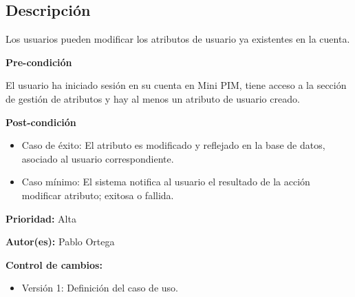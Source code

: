 

\subsection*{Descripción}
Los usuarios pueden modificar los atributos de usuario ya existentes en la cuenta.
\vspace{0.15cm}

\textbf{Pre-condición}\par
El usuario ha iniciado sesión en su cuenta en Mini PIM, tiene acceso a la sección de gestión de atributos y hay al menos un atributo de usuario creado.\par
\vspace{0.15cm}

\textbf{Post-condición}
\begin{itemize}
    \item Caso de éxito: El atributo es modificado y reflejado en la base de datos, asociado al usuario correspondiente.
    \item Caso mínimo: El sistema notifica al usuario el resultado de la acción modificar atributo; exitosa o fallida.
\end{itemize}

\textbf{Prioridad: }
Alta
\vspace{0.15cm}

\textbf{Autor(es): }
Pablo Ortega\par
\vspace{0.15cm}

\textbf{Control de cambios: }
\begin{itemize}
    \item Versión 1: Definición del caso de uso.
\end{itemize}

